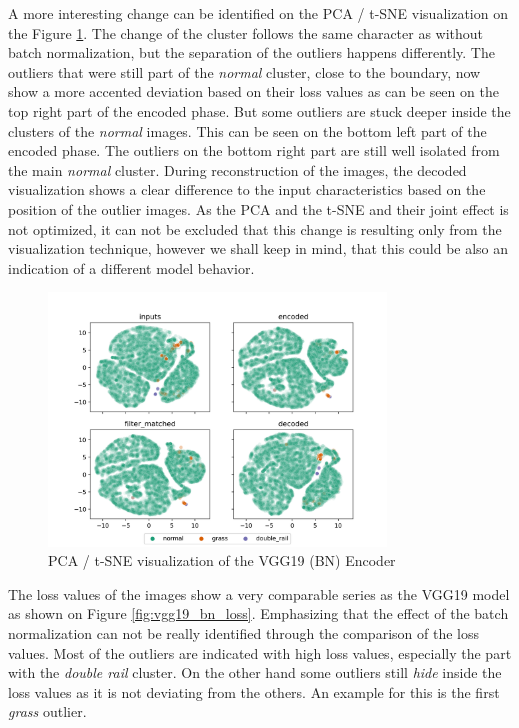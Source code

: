 A more interesting change can be identified on the PCA / t-SNE visualization on the
Figure \ref{fig:vgg19_bn_pca}.
The change of the cluster follows the same character as without batch normalization, but the separation
of the outliers happens differently.
The outliers that were still part of the \emph{normal} cluster, close to the boundary, now show a more
accented deviation based on their loss values as can be seen on the top right part of the encoded phase.
But some outliers are stuck deeper inside the clusters of the \emph{normal} images.
This can be seen on the bottom left part of the encoded phase.
The outliers on the bottom right part are still well isolated from the main \emph{normal} cluster.
During reconstruction of the images, the decoded visualization shows a clear difference to the input
characteristics based on the position of the outlier images.
As the PCA and the t-SNE and their joint effect is not optimized, it can not be excluded that this change
is resulting only from the visualization technique, however we shall keep in mind, that this could be
also an indication of a different model behavior.

\begin{figure}[H]
    \centering
    \includegraphics[width=0.8\textwidth,trim={0 0 0 1cm},clip]{./results/vgg19_bn_vgg19/20230525_045131_feature_vectors_1.png}
    \caption{PCA / t-SNE visualization of the VGG19 (BN) Encoder}
    \label{fig:vgg19_bn_pca}
\end{figure}

The loss values of the images show a very comparable series as the VGG19 model as shown on Figure
\ref{fig:vgg19_bn_loss}.
Emphasizing that the effect of the batch normalization can not be really identified through the
comparison of the loss values.
Most of the outliers are indicated with high loss values, especially the part with the \emph{double rail}
cluster.
On the other hand some outliers still \emph{hide} inside the loss values as it is not deviating from
the others.
An example for this is the first \emph{grass} outlier.

